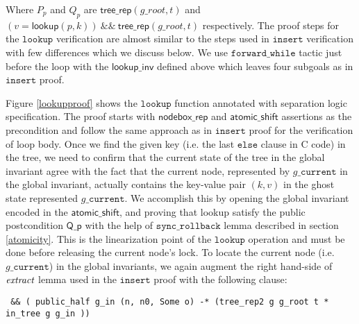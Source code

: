 \documentclass[acmsmall,screen]{acmart}\settopmatter{printfolios=true}
\begin{document}
Where $P_p$ and $Q_p$ are $\mathsf{tree\_rep}(g\_root, t)$ and $(v = \mathsf{lookup}(p,k))\ \&\&\ \mathsf{tree\_rep}(g\_root, t)$ respectively. The proof steps for the $\texttt{lookup}$ verification are almost similar to the steps used in $\texttt{insert}$ verification with few differences which we discuss below. We use $\texttt{forward\_while}$ tactic just before the loop with the $\mathsf{lookup\_inv}$ defined above which leaves four subgoals as in $\texttt{insert}$ proof.

Figure \ref{lookupproof} shows the $\texttt{lookup}$ function annotated with separation logic specification. The proof starts with $\mathsf{nodebox\_rep}$ and $\mathsf{atomic\_shift}$ assertions as the precondition and follow the same approach as in $\texttt{insert}$ proof for the verification of loop body. Once we find the given key (i.e. the last $\texttt{else}$ clause in C code) in the tree, we need to confirm that the current state of the tree in the global invariant agree with the fact that the current node, represented by $g\_\texttt{current}$ in the global invariant, actually contains the key-value pair $(k, v)$ in the ghost state represented $g\_\texttt{current}$. We accomplish this by opening the global invariant encoded in the $\mathsf{atomic\_shift}$, and proving that lookup satisfy the public postcondition $\mathsf{Q\_p}$ with the help of $\texttt{sync\_rollback}$ lemma described in section \ref{atomicity}. This is the linearization point of the $\texttt{lookup}$ operation and must be done before releasing the current node's lock. To locate the current node (i.e.$g\_\texttt{current}$) in the global invariants, we again augment the right hand-side of $\emph{extract}$ lemma used in the $\texttt{insert}$ proof with the following clause:
\begin{verbatim}
 && ( public_half g_in (n, n0, Some o) -* (tree_rep2 g g_root t * in_tree g g_in ))
 \end{verbatim}
  
\end{document}
